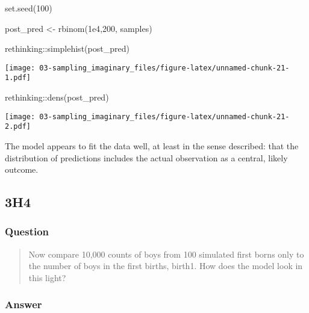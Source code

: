 \documentclass[
]{book}
\newenvironment{Shaded}{\begin{snugshade}}{\end{snugshade}}
\newcommand{\DecValTok}[1]{\textcolor[rgb]{0.00,0.00,0.81}{#1}}
\newcommand{\FloatTok}[1]{\textcolor[rgb]{0.00,0.00,0.81}{#1}}
\newcommand{\FunctionTok}[1]{\textcolor[rgb]{0.00,0.00,0.00}{#1}}
\newcommand{\NormalTok}[1]{#1}
\newcommand{\OtherTok}[1]{\textcolor[rgb]{0.56,0.35,0.01}{#1}}
\newcommand{\SpecialCharTok}[1]{\textcolor[rgb]{0.00,0.00,0.00}{#1}}
\begin{document}
\begin{Shaded}
\begin{Highlighting}[]
\FunctionTok{set.seed}\NormalTok{(}\DecValTok{100}\NormalTok{)}

\NormalTok{post\_pred }\OtherTok{\textless{}{-}} \FunctionTok{rbinom}\NormalTok{(}\FloatTok{1e4}\NormalTok{,}\DecValTok{200}\NormalTok{, samples)}

\NormalTok{rethinking}\SpecialCharTok{::}\FunctionTok{simplehist}\NormalTok{(post\_pred)}
\end{Highlighting}
\end{Shaded}

\texttt{[image: 03-sampling\_imaginary\_files/figure-latex/unnamed-chunk-21-1.pdf]}

\begin{Shaded}
\begin{Highlighting}[]
\NormalTok{rethinking}\SpecialCharTok{::}\FunctionTok{dens}\NormalTok{(post\_pred)}
\end{Highlighting}
\end{Shaded}

\texttt{[image: 03-sampling\_imaginary\_files/figure-latex/unnamed-chunk-21-2.pdf]}

The model appears to fit the data well, at least in the sense described: that the distribution of predictions includes the actual observation as a central, likely outcome.

\hypertarget{h4-1}{%
\subsection*{3H4}\label{h4-1}}

\hypertarget{question-31}{%
\subsubsection*{Question}\label{question-31}}

\begin{quote}
Now compare 10,000 counts of boys from 100 simulated first borns only to the number of boys in the first births, birth1. How does the model look in this light?
\end{quote}

\hypertarget{answer-31}{%
\subsubsection*{Answer}\label{answer-31}}
\end{document}

